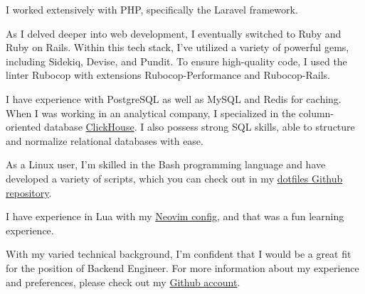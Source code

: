 
\begin{cvparagraph}

I worked extensively with PHP, specifically the Laravel framework.

As I delved deeper into web development, I eventually switched to Ruby and Ruby on Rails.
Within this tech stack, I've utilized a variety of powerful gems, including Sidekiq, Devise, and Pundit.
To ensure high-quality code, I used the linter Rubocop with extensions Rubocop-Performance and Rubocop-Rails.

I have experience with PostgreSQL as well as MySQL and Redis for caching.
When I was working in an analytical company, I specialized in the column-oriented database \href{https://clickhouse.com/}{ClickHouse}.
I also possess strong SQL skills, able to structure and normalize relational databases with ease.

As a Linux user, I'm skilled in the Bash programming language and have developed a variety
of scripts, which you can check out in my \href{https://github.com/wittyjudge/dotfiles/tree/master/.local/bin}{dotfiles Github repository}.

I have experience in Lua with my \href{https://github.com/WIttyJudge/dotfiles/tree/master/.config/nvim}{Neovim config}, and that was a fun learning experience.

With my varied technical background, I'm confident that I would be a great fit for the position of Backend Engineer.
For more information about my experience and preferences, please check out my \href{https://github.com/wittyjudge}{Github account}.

\end{cvparagraph}
